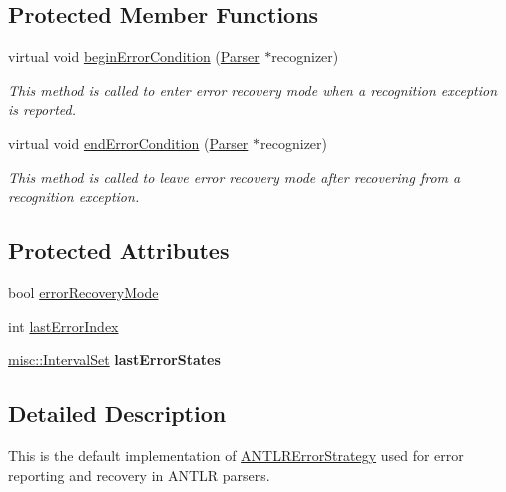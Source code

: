 \subsection*{Protected Member Functions}
\begin{DoxyCompactItemize}
\item 
virtual void \hyperlink{classantlr4_1_1DefaultErrorStrategy_a6408837d5375351acbcd1595c8d5ab79}{begin\+Error\+Condition} (\hyperlink{classantlr4_1_1Parser}{Parser} $\ast$recognizer)
\begin{DoxyCompactList}\small\item\em This method is called to enter error recovery mode when a recognition exception is reported. \end{DoxyCompactList}\item 
virtual void \hyperlink{classantlr4_1_1DefaultErrorStrategy_ae04080b08ef36ab9586fe2273ce960f0}{end\+Error\+Condition} (\hyperlink{classantlr4_1_1Parser}{Parser} $\ast$recognizer)
\begin{DoxyCompactList}\small\item\em This method is called to leave error recovery mode after recovering from a recognition exception. \end{DoxyCompactList}\end{DoxyCompactItemize}
\subsection*{Protected Attributes}
\begin{DoxyCompactItemize}
\item 
bool \hyperlink{classantlr4_1_1DefaultErrorStrategy_a612c641ac64e59200bfeaf1f52b8e31e}{error\+Recovery\+Mode}
\item 
int \hyperlink{classantlr4_1_1DefaultErrorStrategy_ac0c7e89ac7e3c12ca0e44f0d2bda5faa}{last\+Error\+Index}
\item 
\mbox{\label{classantlr4_1_1DefaultErrorStrategy_afe3424fbb3b19bca2a9ce4e9ca281d9a}} 
\hyperlink{classantlr4_1_1misc_1_1IntervalSet}{misc\+::\+Interval\+Set} {\bfseries last\+Error\+States}
\end{DoxyCompactItemize}


\subsection{Detailed Description}
This is the default implementation of \hyperlink{classantlr4_1_1ANTLRErrorStrategy}{A\+N\+T\+L\+R\+Error\+Strategy} used for error reporting and recovery in A\+N\+T\+LR parsers. 

